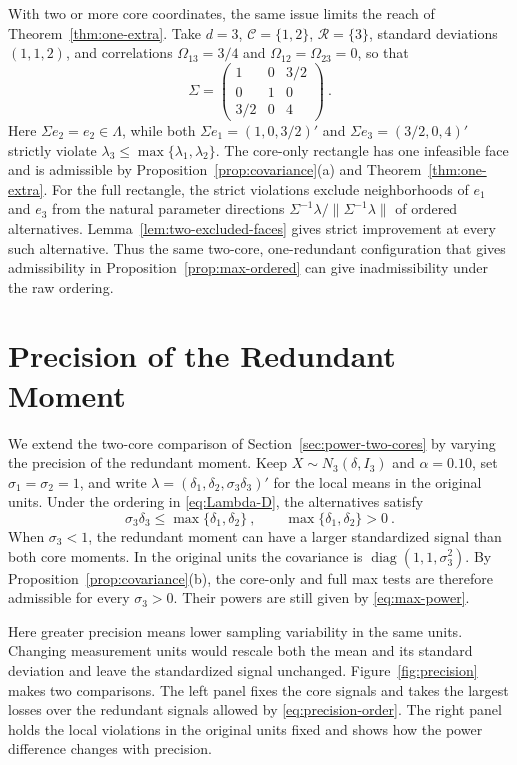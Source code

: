 \documentclass[11pt]{article}
\newcommand{\red}[1]{{\color{red}#1}} %
\numberwithin{equation}{section}
\theoremstyle{definition}
\begin{document}
With two or more core coordinates, the same issue limits the reach of Theorem~\ref{thm:one-extra}. Take $d=3$, $\mathcal C=\{1,2\}$, $\mathcal R=\{3\}$, standard deviations $(1,1,2)$, and correlations $\Omega_{13}=3/4$ and $\Omega_{12}=\Omega_{23}=0$, so that
\[
\Sigma=\begin{pmatrix}1&0&3/2\\0&1&0\\3/2&0&4\end{pmatrix}~.
\]
\red{Here $\Sigma e_2=e_2\in\Lambda$, while both $\Sigma e_1=(1,0,3/2)'$ and $\Sigma e_3=(3/2,0,4)'$ strictly violate $\lambda_3\le\max\{\lambda_1,\lambda_2\}$. The core-only rectangle has one infeasible face and is admissible by Proposition~\ref{prop:covariance}(a) and Theorem~\ref{thm:one-extra}. For the full rectangle, the strict violations exclude neighborhoods of $e_1$ and $e_3$ from the natural parameter directions $\Sigma^{-1}\lambda/\|\Sigma^{-1}\lambda\|$ of ordered alternatives. Lemma~\ref{lem:two-excluded-faces} gives strict improvement at every such alternative. Thus the same two-core, one-redundant configuration that gives admissibility in Proposition~\ref{prop:max-ordered} can give inadmissibility under the raw ordering.}

\clearpage
\section{Precision of the Redundant Moment}\label{app:precision}\label{sec:power-precision}

We extend the two-core comparison of Section~\ref{sec:power-two-cores} by varying the precision of the redundant moment. Keep $X\sim N_3(\delta,I_3)$ and $\alpha=0.10$, set $\sigma_1=\sigma_2=1$, \red{and write $\lambda=(\delta_1,\delta_2,\sigma_3\delta_3)'$ for the local means in the original units. Under the ordering in \eqref{eq:Lambda-D}, the alternatives satisfy}
\begin{equation}\label{eq:precision-order}
\sigma_3\delta_3\le\max\{\delta_1,\delta_2\}~,
\qquad \max\{\delta_1,\delta_2\}>0~.
\end{equation}
When $\sigma_3<1$, the redundant moment can have a larger standardized signal than both core moments. \red{In the original units the covariance is $\operatorname{diag}(1,1,\sigma_3^2)$. By Proposition~\ref{prop:covariance}(b), the core-only and full max tests are therefore admissible for every $\sigma_3>0$.} Their powers are still given by \eqref{eq:max-power}.

Here greater precision means lower sampling variability in the same units. Changing measurement units would rescale both the mean and its standard deviation and leave the standardized signal unchanged. Figure~\ref{fig:precision} makes two comparisons. The left panel fixes the core signals and takes the largest losses over the redundant signals allowed by \eqref{eq:precision-order}. The right panel holds the local violations in the original units fixed and shows how the power difference changes with precision.
\end{document}
